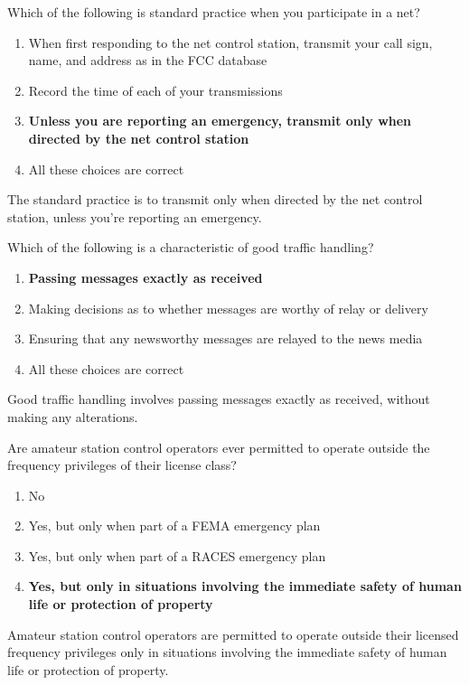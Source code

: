 \begin{tcolorbox}[colback=gray!10!white,colframe=black!75!black,title={T2C07}]
    Which of the following is standard practice when you participate in a net?
    \begin{enumerate}[label=\Alph*),noitemsep]
        \item When first responding to the net control station, transmit your call sign, name, and address as in the FCC database
        \item Record the time of each of your transmissions
        \item \textbf{Unless you are reporting an emergency, transmit only when directed by the net control station}
        \item All these choices are correct
    \end{enumerate}
\end{tcolorbox}
The standard practice is to transmit only when directed by the net control station, unless you're reporting an emergency.

\begin{tcolorbox}[colback=gray!10!white,colframe=black!75!black,title={T2C08}]
    Which of the following is a characteristic of good traffic handling?
    \begin{enumerate}[label=\Alph*),noitemsep]
        \item \textbf{Passing messages exactly as received}
        \item Making decisions as to whether messages are worthy of relay or delivery
        \item Ensuring that any newsworthy messages are relayed to the news media
        \item All these choices are correct
    \end{enumerate}
\end{tcolorbox}
Good traffic handling involves passing messages exactly as received, without making any alterations.

\begin{tcolorbox}[colback=gray!10!white,colframe=black!75!black,title={T2C09}]
    Are amateur station control operators ever permitted to operate outside the frequency privileges of their license class?
    \begin{enumerate}[label=\Alph*),noitemsep]
        \item No
        \item Yes, but only when part of a FEMA emergency plan
        \item Yes, but only when part of a RACES emergency plan
        \item \textbf{Yes, but only in situations involving the immediate safety of human life or protection of property}
    \end{enumerate}
\end{tcolorbox}
Amateur station control operators are permitted to operate outside their licensed frequency privileges only in situations involving the immediate safety of human life or protection of property.

